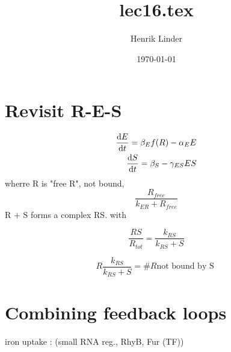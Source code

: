 \documentclass{article}
\title{lec16.tex }
\author{Henrik Linder}
\date{\today}
\begin{document}
\maketitle


\section{Revisit R-E-S}
\begin{equation}
	\begin{split}
	\dv {E}{t} = \beta _E f(R)- \alpha_EE\\
	\dv {S}{t} = \beta _S- \gamma_{ES}ES
	\end{split}
\end{equation}
wherre R is "free R", not bound, 
\begin{equation}
	\frac{R_{free}}{k_{ER} + R_{free}}
\end{equation}
R + S forms a complex RS. with 

\begin{equation}
	\frac{RS}{R_{tot}} = \frac{k_{RS}}{k_{RS} + S}
\end{equation}

\begin{equation}
	R \frac{k_{RS}}{k_{RS} + S} = \#R \text{not bound by S }
\end{equation}





\section{Combining feedback loops}
iron uptake : (small RNA reg., RhyB, Fur (TF))
\end{document}
